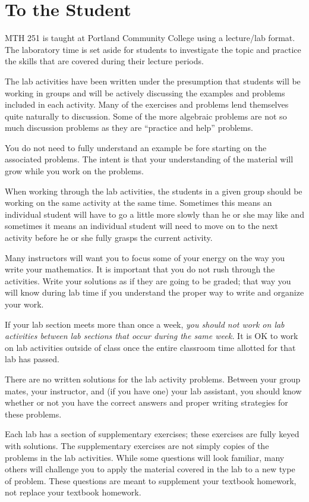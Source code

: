 \documentclass[10pt,oneside,]{book}
\theoremstyle{plain}
\theoremstyle{definition}
\numberwithin{equation}{section}
\begin{document}
\chapter*{To the Student}\label{to-the-student}
MTH 251 is taught at Portland Community College using a lecture/lab format. The laboratory time is set aside for students to investigate the topic and practice the skills that are covered during their lecture periods.%
\par
The lab activities have been written under the presumption that students will be working in groups and will be actively discussing the examples and problems included in each activity. Many of the exercises and problems lend themselves quite naturally to discussion. Some of the more algebraic problems are not so much discussion problems as they are ``practice and help'' problems.%
\par
You do not need to fully understand an example be fore starting on the associated problems. The intent is that your understanding of the material will grow while you work on the problems.%
\par
When working through the lab activities, the students in a given group should be working on the same activity at the same time. Sometimes this means an individual student will have to go a little more slowly than he or she may like and sometimes it means an individual student will need to move on to the next activity before he or she fully grasps the current activity.%
\par
Many instructors will want you to focus some of your energy on the way you write your mathematics. It is important that you do not rush through the activities. Write your solutions as if they are going to be graded; that way you will know during lab time if you understand the proper way to write and organize your work.%
\par
If your lab section meets more than once a week, \emph{you should not work on lab activities between lab sections that occur during the same week.} It is OK to work on lab activities outside of class once the entire classroom time allotted for that lab has passed.%
\par
There are no written solutions for the lab activity problems. Between your group mates, your instructor, and (if you have one) your lab assistant, you should know whether or not you have the correct answers and proper writing strategies for these problems.%
\par
Each lab has a section of supplementary exercises; these exercises are fully keyed with solutions. The supplementary exercises are not simply copies of the problems in the lab activities. While some questions will look familiar, many others will challenge you to apply the material covered in the lab to a new type of problem. These questions are meant to supplement your textbook homework, not replace your textbook homework.%
\end{document}
